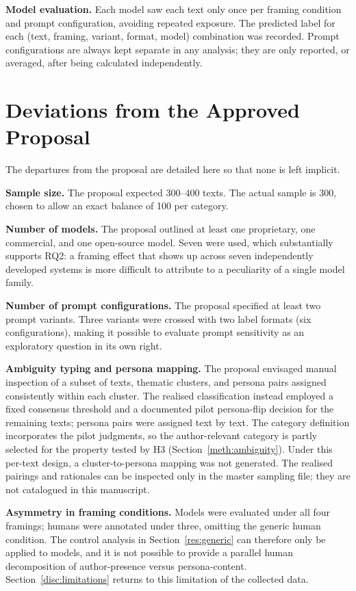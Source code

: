 \textbf{Model evaluation.} Each model saw each text only once per framing condition and prompt
configuration, avoiding repeated exposure. The predicted label for each (text, framing, variant,
format, model) combination was recorded. Prompt configurations are always kept separate in any
analysis; they are only reported, or averaged, after being calculated independently.

\section{Deviations from the Approved Proposal}
\label{meth:deviations}

\noindent
The departures from the proposal are detailed here so that none is left implicit.

\textbf{Sample size.} The proposal expected 300--400 texts. The actual sample is 300, chosen to
allow an exact balance of 100 per category.

\textbf{Number of models.} The proposal outlined at least one proprietary, one commercial, and one
open-source model. Seven were used, which substantially supports RQ2: a framing effect that shows
up across seven independently developed systems is more difficult to attribute to a peculiarity
of a single model family.

\textbf{Number of prompt configurations.} The proposal specified at least two prompt variants.
Three variants were crossed with two label formats (six configurations), making it possible to
evaluate prompt sensitivity as an exploratory question in its own right.

\textbf{Ambiguity typing and persona mapping.} The proposal envisaged manual inspection of a
subset of texts, thematic clusters, and persona pairs assigned consistently within each cluster. The
realised classification instead employed a fixed consensus threshold and a documented pilot
persona-flip decision for the remaining texts; persona pairs were assigned text by text. The
category definition incorporates the pilot judgments, so the author-relevant category is partly
selected for the property tested by H3 (Section~\ref{meth:ambiguity}). Under this per-text
design, a cluster-to-persona mapping was not generated. The realised pairings and rationales
can be inspected only in the master sampling file; they are not catalogued in this manuscript.

\textbf{Asymmetry in framing conditions.} Models were evaluated under all four framings; humans
were annotated under three, omitting the generic human condition. The control analysis in
Section~\ref{res:generic} can therefore only be applied to models, and it is not possible to
provide a parallel human decomposition of author-presence versus persona-content.
Section~\ref{disc:limitations} returns to this limitation of the collected data.

